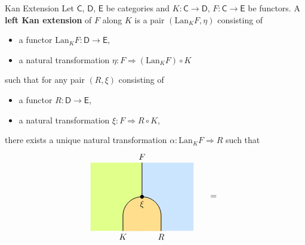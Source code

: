 \begin{definition}{Kan Extension}{}
    Let $\mathsf{C}$, $\mathsf{D}$, $\mathsf{E}$ be categories and $K:\mathsf{C}\to\mathsf{D}$, $F:\mathsf{C}\to\mathsf{E}$ be functors. A \textbf{left Kan extension} of $F$ along $K$ is a pair $\left(\mathrm{Lan}_KF,\eta\right)$ consisting of
    \begin{itemize}
        \item a functor $\mathrm{Lan}_KF:\mathsf{D}\to\mathsf{E}$,
        \item a natural transformation $\eta:F\Rightarrow \left(\mathrm{Lan}_KF\right)\circ K$
    \end{itemize}
    \begin{center}
    \end{center}
    such that for any pair $\left(R,\xi\right)$ consisting of
    \begin{itemize}
        \item a functor $R:\mathsf{D}\to\mathsf{E}$,
        \item a natural transformation $\xi:F\Rightarrow R\circ K$,
    \end{itemize}
    there exists a unique natural transformation $\alpha: \mathrm{Lan}_KF\Rightarrow R$ such that
    \[
        \begin{tikzpicture}[x=0.8cm,y=0.8cm, line width=0.7pt, hollow/.style={
                circle,
                fill=white,
                draw,
                outer sep=0pt,
                inner sep=1.5pt,
                line width=0.7pt
              }]
            \definecolor{leftcolor}{RGB}{224, 255, 139}
            \definecolor{midcolor}{RGB}{255, 222, 142}
            \definecolor{rightcolor}{RGB}{204, 229, 255}
    
        \node at (3.75, 1.8) {$=$};
    
        \begin{scope}
            \begin{scope} 
                \clip (-2.7,0) rectangle (2.7, 3.6);     
                \fill[fill=leftcolor] (-3,0) rectangle (0, 4);  
                \fill[fill=rightcolor] (0,0) rectangle (3, 4);  
                \draw[fill=midcolor, rounded corners=0.8cm, line width=0.7pt] (-1, -3) rectangle (1, 1.8);
            \end{scope}
            \draw (0, 3.6) -- (0, 1.8);
            \filldraw [black] (0,1.8) circle (2pt) node[below=1pt] {$\xi$};
            \node[below] at (-1, 0) {$K$};
            \node[below] at (1, 0) {$R$};
            \node[above] at (0, 3.6) {$F$};
        \end{scope}
    

\end{tikzpicture}\]
\end{definition}
